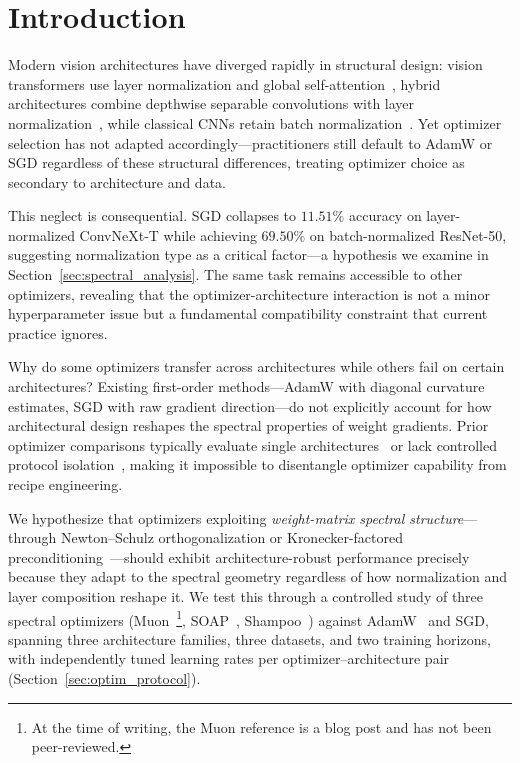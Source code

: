 \section{Introduction}
\label{sec:introduction}

Modern vision architectures have diverged rapidly in structural design: vision transformers use layer normalization and global self-attention~\cite{touvron2021training}, hybrid architectures combine depthwise separable convolutions with layer normalization~\cite{liu2022convnet}, while classical CNNs retain batch normalization~\cite{he2016deep}. Yet optimizer selection has not adapted accordingly---practitioners still default to AdamW or SGD regardless of these structural differences, treating optimizer choice as secondary to architecture and data.

This neglect is consequential. SGD collapses to $11.51\%$ accuracy on layer-normalized ConvNeXt-T while achieving $69.50\%$ on batch-normalized ResNet-50, suggesting normalization type as a critical factor---a hypothesis we examine in Section~\ref{sec:spectral_analysis}. The same task remains accessible to other optimizers, revealing that the optimizer-architecture interaction is not a minor hyperparameter issue but a fundamental compatibility constraint that current practice ignores.

Why do some optimizers transfer across architectures while others fail on certain architectures? Existing first-order methods---AdamW with diagonal curvature estimates, SGD with raw gradient direction---do not explicitly account for how architectural design reshapes the spectral properties of weight gradients. Prior optimizer comparisons typically evaluate single architectures~\cite{schmidt2021crowdedvalley} or lack controlled protocol isolation~\cite{choi2020optimizers}, making it impossible to disentangle optimizer capability from recipe engineering.

We hypothesize that optimizers exploiting \emph{weight-matrix spectral structure}---through Newton--Schulz orthogonalization or Kronecker-factored preconditioning~\cite{bernstein2024old}---should exhibit architecture-robust performance precisely because they adapt to the spectral geometry regardless of how normalization and layer composition reshape it. We test this through a controlled study of three spectral optimizers (Muon~\cite{jordan2024muon}\footnote{At the time of writing, the Muon reference is a blog post and has not been peer-reviewed.}, SOAP~\cite{vyas2024soap}, Shampoo~\cite{gupta2018shampoo}) against AdamW~\cite{loshchilov2019decoupled} and SGD, spanning three architecture families, three datasets, and two training horizons, with independently tuned learning rates per optimizer--architecture pair (Section~\ref{sec:optim_protocol}).


